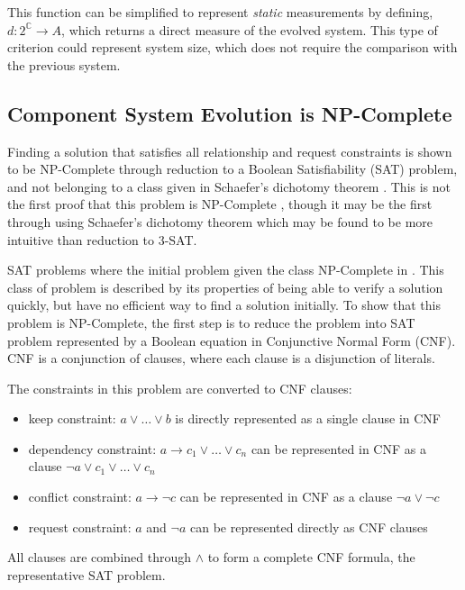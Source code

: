 This function can be simplified to represent \textit{static} measurements by defining, $d: 2^\mathbb{C} \rightarrow A$, which returns a direct measure of the evolved system.
This type of criterion could represent system size, which does not require the comparison with the previous system.

\subsection{Component System Evolution is NP-Complete}
Finding a solution that satisfies all relationship and request constraints is shown to be NP-Complete through reduction to a Boolean Satisfiability (SAT) problem,
and not belonging to a class given in Schaefer's dichotomy theorem \cite{Schaefer1978}.
This is not the first proof that this problem is NP-Complete \cite{edos2005report}, 
though it may be the first through using Schaefer's dichotomy theorem which may be found to be more intuitive than reduction to 3-SAT.

SAT problems where the initial problem given the class NP-Complete in \cite{cook1971}.
This class of problem is described by its properties of being able to verify a solution quickly, but have no efficient way to find a solution initially.
To show that this problem is NP-Complete, the first step is to reduce the problem into SAT problem represented by a Boolean equation in Conjunctive Normal Form (CNF).
CNF is a conjunction of clauses, where each clause is a disjunction of literals.

The constraints in this problem are converted to CNF clauses:
\begin{itemize}
  \item keep constraint: $a \vee \ldots \vee b$ is directly represented as a single clause in CNF
  \item dependency constraint: $a \rightarrow c_1 \vee \ldots \vee c_n$ can be represented in CNF as a clause $\neg a \vee c_1 \vee \ldots \vee c_n$
  \item conflict constraint: $a \rightarrow \neg c$ can be represented in CNF as a clause $\neg a \vee \neg c$
  \item request constraint: $a$ and $\neg a$ can be represented directly as CNF clauses
\end{itemize}
All clauses are combined through $\wedge$ to form a complete CNF formula, the representative SAT problem.

